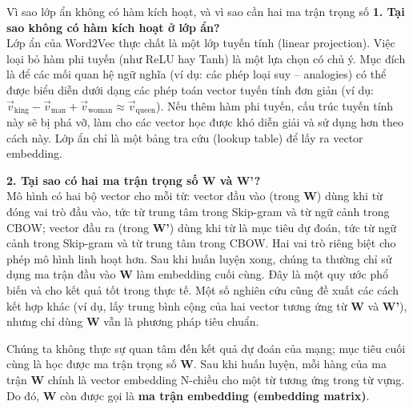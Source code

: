 \begin{deepdive}{Vì sao lớp ẩn không có hàm kích hoạt, và vì sao cần hai ma trận trọng số}
\textbf{1. Tại sao không có hàm kích hoạt ở lớp ẩn?} \\
Lớp ẩn của Word2Vec thực chất là một lớp tuyến tính (linear projection). Việc loại bỏ hàm phi tuyến (như ReLU hay Tanh) là một lựa chọn có chủ ý. Mục đích là để các mối quan hệ ngữ nghĩa (ví dụ: các phép loại suy -- analogies) có thể được biểu diễn dưới dạng các phép toán vector tuyến tính đơn giản (ví dụ: $\vec{v}_{\text{king}} - \vec{v}_{\text{man}} + \vec{v}_{\text{woman}} \approx \vec{v}_{\text{queen}}$). Nếu thêm hàm phi tuyến, cấu trúc tuyến tính này sẽ bị phá vỡ, làm cho các vector học được khó diễn giải và sử dụng hơn theo cách này. Lớp ẩn chỉ là một bảng tra cứu (lookup table) để lấy ra vector embedding.

\textbf{2. Tại sao có hai ma trận trọng số W và W'?} \\
Mô hình có hai bộ vector cho mỗi từ: vector đầu vào (trong \textbf{W}) dùng khi từ đóng vai trò đầu vào, tức từ trung tâm trong Skip-gram và từ ngữ cảnh trong CBOW; vector đầu ra (trong \textbf{W'}) dùng khi từ là mục tiêu dự đoán, tức từ ngữ cảnh trong Skip-gram và từ trung tâm trong CBOW. Hai vai trò riêng biệt cho phép mô hình linh hoạt hơn. Sau khi huấn luyện xong, chúng ta thường chỉ sử dụng ma trận đầu vào \textbf{W} làm embedding cuối cùng. Đây là một quy ước phổ biến và cho kết quả tốt trong thực tế. Một số nghiên cứu cũng đề xuất các cách kết hợp khác (ví dụ, lấy trung bình cộng của hai vector tương ứng từ \textbf{W} và \textbf{W'}), nhưng chỉ dùng \textbf{W} vẫn là phương pháp tiêu chuẩn.
\end{deepdive}

Chúng ta không thực sự quan tâm đến kết quả dự đoán của mạng; mục tiêu cuối cùng là học được ma trận trọng số \textbf{W}. Sau khi huấn luyện, mỗi hàng của ma trận \textbf{W} chính là vector embedding N-chiều cho một từ tương ứng trong từ vựng. Do đó, \textbf{W} còn được gọi là \textbf{ma trận embedding (embedding matrix)}.

\begin{center}
    \label{fig:word2vec_architecture}
\end{center}

